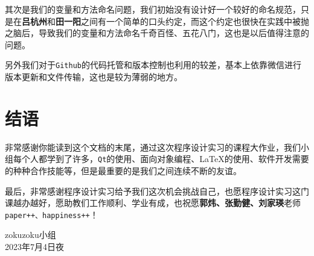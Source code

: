 \documentclass[hyperref,a4paper,UTF8]{ctexart}
\begin{document}
其次是我们的变量和方法命名问题，我们初始没有设计好一个较好的命名规范，只是在\textbf{吕杭州}和\textbf{田一阳}之间有一个简单的口头约定，而这个约定也很快在实践中被抛之脑后，导致我们的变量和方法命名千奇百怪、五花八门，这也是以后值得注意的问题。

另外我们对于\texttt{Github}的代码托管和版本控制也利用的较差，基本上依靠微信进行版本更新和文件传输，这也是较为薄弱的地方。


\section{结语}

非常感谢你能读到这个文档的末尾，通过这次程序设计实习的课程大作业，我们小组每个人都学到了许多，\texttt{Qt}的使用、面向对象编程、\LaTeX 的使用、软件开发需要的种种合作技能等，但是最重要的是我们之间连续不断的友谊。

最后，非常感谢程序设计实习给予我们这次机会挑战自己，也愿程序设计实习这门课越办越好，愿助教们工作顺利、学业有成，也祝愿\textbf{郭炜、张勤健、刘家瑛}老师\texttt{paper++、happiness++}！

\begin{flushright}
    zokuzoku小组 \\
    2023年7月4日夜
\end{flushright}
    
\end{document}
